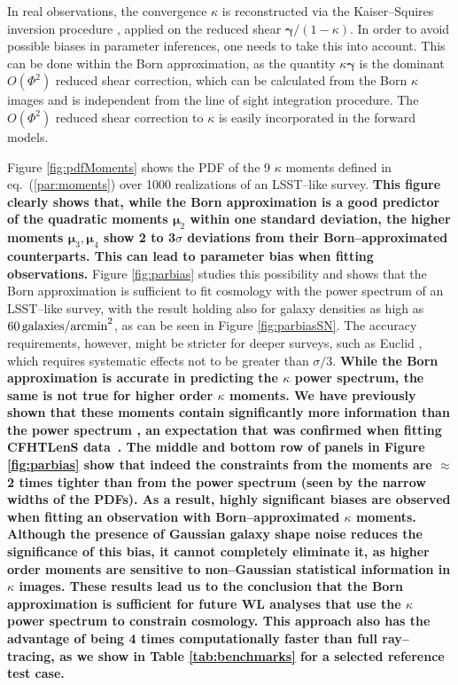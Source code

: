 \documentclass[reprint,aps,prd,superscriptaddress,showkeys,showpacs]{revtex4-1}
\begin{document}
In real observations, the convergence $\kappa$ is reconstructed via the Kaiser--Squires inversion procedure \citep{KaiserSquires}, applied on the reduced shear $\pmb{\gamma}/(1-\kappa)$. In order to avoid possible biases in parameter inferences, one needs to take this into account. This can be done within the Born approximation, as the quantity $\kappa\pmb{\gamma}$ is the dominant $O(\Phi^2)$ reduced shear correction, which can be calculated from the Born $\kappa$ images and is independent from the line of sight integration procedure. The $O(\Phi^2)$ reduced shear correction to $\kappa$ is easily incorporated in the forward models.

Figure \ref{fig:pdfMoments} shows the PDF of the 9 $\kappa$ moments defined in eq.~(\ref{par:moments}) over 1000 realizations of an LSST--like survey. \textbf{\color{red} This figure clearly shows that, while the Born approximation is a good predictor of the quadratic moments $\pmb{\mu}_2$ within one standard deviation, the higher moments $\pmb{\mu}_3,\pmb{\mu}_4$ show 2 to 3$\sigma$ deviations from their Born--approximated counterparts. This can lead to parameter bias when fitting observations.} Figure \ref{fig:parbias} studies this possibility and shows that the Born approximation is sufficient to fit cosmology with the power spectrum of an LSST--like survey, with the result holding also for galaxy densities as high as $60\,{\rm galaxies/arcmin}^2$, as can be seen in Figure \ref{fig:parbiasSN}. The accuracy requirements, however, might be stricter for deeper surveys, such as Euclid \citep{Euclid}, which requires systematic effects not to be greater than $\sigma/3$. \textbf{\color{red} While the Born approximation is accurate in predicting the $\kappa$ power spectrum, the same is not true for higher order $\kappa$ moments. We have previously shown that these moments contain significantly more information than the power spectrum \citep{MinkPetri}, an expectation that was confirmed when fitting CFHTLenS data~\citep{CFHTMink}. The middle and bottom row of panels in Figure \ref{fig:parbias} show that indeed the constraints from the moments are $\approx$ 2 times tighter than from the power spectrum (seen by the narrow widths of the PDFs). As a result, highly significant biases are observed when fitting an observation with Born--approximated $\kappa$ moments. Although the presence of Gaussian galaxy shape noise reduces the significance of this bias, it cannot completely eliminate it, as higher order moments are sensitive to non--Gaussian statistical information in $\kappa$ images. 
These results lead us to the conclusion that the Born approximation is sufficient for future WL analyses that use the $\kappa$ power spectrum to constrain cosmology. This approach also has the advantage of being 4 times computationally faster than full ray--tracing, as we show in Table \ref{tab:benchmarks} for a selected reference test case.} 
\end{document}
